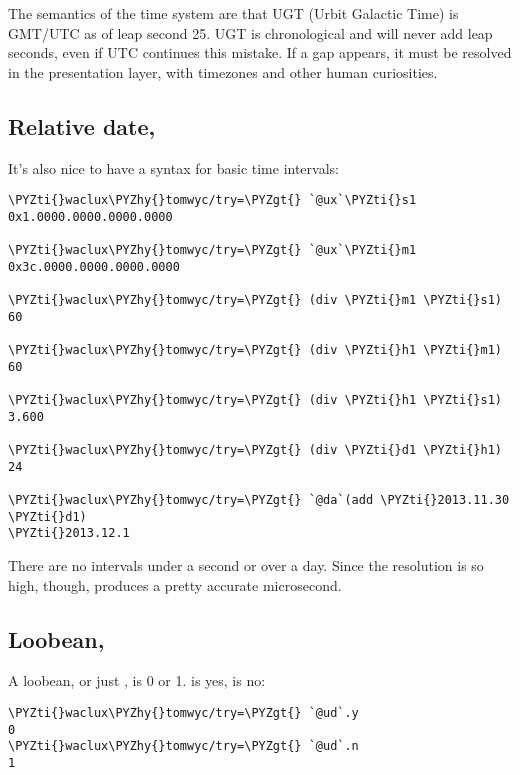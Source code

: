 The semantics of the time system are that UGT (Urbit Galactic
Time) is GMT/UTC as of leap second 25.  UGT is chronological and
will never add leap seconds, even if UTC continues this mistake.
If a gap appears, it must be resolved in the presentation layer,
with timezones and other human curiosities.

\subsection{Relative date, }

It's also nice to have a syntax for basic time intervals:

\begin{framed_shaded}
\begin{Verbatim}[fontsize=\relsize{-2.5},fontseries=b,commandchars=\\\{\}]
\PYZti{}waclux\PYZhy{}tomwyc/try=\PYZgt{} `@ux`\PYZti{}s1
0x1.0000.0000.0000.0000

\PYZti{}waclux\PYZhy{}tomwyc/try=\PYZgt{} `@ux`\PYZti{}m1
0x3c.0000.0000.0000.0000

\PYZti{}waclux\PYZhy{}tomwyc/try=\PYZgt{} (div \PYZti{}m1 \PYZti{}s1)
60

\PYZti{}waclux\PYZhy{}tomwyc/try=\PYZgt{} (div \PYZti{}h1 \PYZti{}m1)
60

\PYZti{}waclux\PYZhy{}tomwyc/try=\PYZgt{} (div \PYZti{}h1 \PYZti{}s1)
3.600

\PYZti{}waclux\PYZhy{}tomwyc/try=\PYZgt{} (div \PYZti{}d1 \PYZti{}h1)
24

\PYZti{}waclux\PYZhy{}tomwyc/try=\PYZgt{} `@da`(add \PYZti{}2013.11.30 \PYZti{}d1)
\PYZti{}2013.12.1
\end{Verbatim}
\end{framed_shaded}

There are no  intervals under a second or over a day.  Since
the resolution is so high, though,  produces
a pretty accurate microsecond.

\subsection{Loobean, }

A loobean, or just , is 0 or 1.   is yes,  is no:

\begin{framed_shaded}
\begin{Verbatim}[fontsize=\relsize{-2.5},fontseries=b,commandchars=\\\{\}]
\PYZti{}waclux\PYZhy{}tomwyc/try=\PYZgt{} `@ud`.y
0
\PYZti{}waclux\PYZhy{}tomwyc/try=\PYZgt{} `@ud`.n
1
\end{Verbatim}
\end{framed_shaded}

